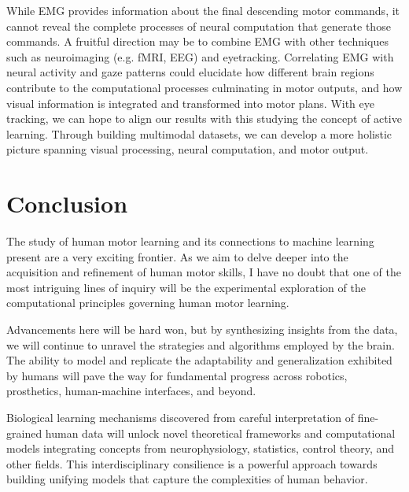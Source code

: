 \documentclass[../main.tex]{subfiles}
\begin{document}
While EMG provides information about the final descending motor commands, it cannot reveal the complete processes of neural computation that generate those commands. A fruitful direction may be to combine EMG with other techniques such as neuroimaging (e.g. fMRI, EEG) and eyetracking. Correlating EMG with neural activity and gaze patterns could elucidate how different brain regions contribute to the computational processes culminating in motor outputs, and how visual information is integrated and transformed into motor plans. With eye tracking, we can hope to align our results with this studying the concept of active learning\cite{yangTheoreticalPerspectivesActive2016,huangActiveLearningLearning2008}. Through building multimodal datasets, we can develop a more holistic picture spanning visual processing, neural computation, and motor output.

























\section{Conclusion} %

The study of human motor learning and its connections to machine learning present are a very exciting frontier. As we aim to delve deeper into the acquisition and refinement of human motor skills, I have no doubt that one of the most intriguing lines of inquiry will be the experimental exploration of the computational principles governing human motor learning. 

Advancements here will be hard won, but by synthesizing insights from the data, we will continue to unravel the strategies and algorithms employed by the brain. The ability to model and replicate the adaptability and generalization exhibited by humans will pave the way for fundamental progress across robotics, prosthetics, human-machine interfaces, and beyond.

Biological learning mechanisms discovered from careful interpretation of fine-grained human data will unlock novel theoretical frameworks and computational models integrating concepts from neurophysiology, statistics, control theory, and other fields. This interdisciplinary consilience is a powerful approach towards building unifying models that capture the complexities of human behavior.
\end{document}
